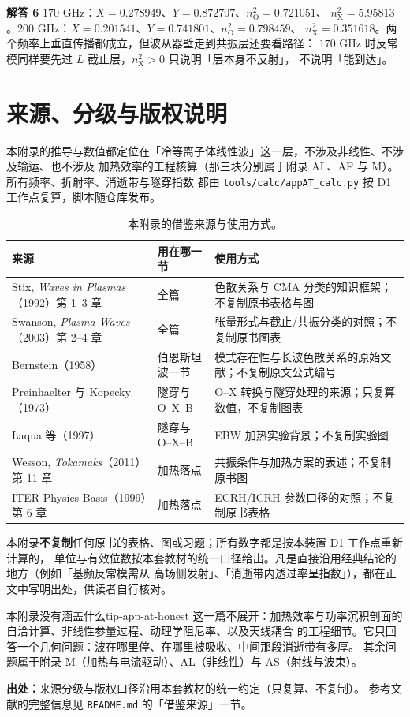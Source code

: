 \textbf{解答 6} $170$ GHz：$X=0.278949$、$Y=0.872707$、$n_\mathrm{O}^2=0.721051$、
$n_\mathrm{X}^2=5.95813$。$200$ GHz：$X=0.201541$、$Y=0.741801$、$n_\mathrm{O}^2=0.798459$、
$n_\mathrm{X}^2=0.351618$。两个频率上垂直传播都成立，但波从器壁走到共振层还要看路径：
$170$ GHz 时反常模同样要先过 $L$ 截止层，$n_\mathrm{X}^2>0$ 只说明「层本身不反射」，
不说明「能到达」。

\section{来源、分级与版权说明}
\label{sec:app-at-source}

\begingroup\small
本附录的推导与数值都定位在「冷等离子体线性波」这一层，不涉及非线性、不涉及输运、也不涉及
加热效率的工程核算（那三块分别属于附录 AL、AF 与 M）。所有频率、折射率、消逝带与隧穿指数
都由 \texttt{tools/\allowbreak{}calc/\allowbreak{}appAT\_calc.py} 按 D1 工作点复算，脚本随仓库发布。

\begin{table}[htbp]
\centering
\small
\caption{本附录的借鉴来源与使用方式。}
\label{tab:app-at-source}
\begin{tabular}{p{4.6cm}p{3.6cm}p{7.6cm}}
\hline
来源 & 用在哪一节 & 使用方式 \\
\hline
Stix, \emph{Waves in Plasmas}（1992）第 1--3 章 & 全篇 & 色散关系与 CMA 分类的知识框架；不复制原书表格与图 \\
Swanson, \emph{Plasma Waves}（2003）第 2--4 章 & 全篇 & 张量形式与截止/共振分类的对照；不复制原书图表 \\
Bernstein（1958）& 伯恩斯坦波一节 & 模式存在性与长波色散关系的原始文献；不复制原文公式编号 \\
Preinhaelter 与 Kopecky（1973）& 隧穿与 O--X--B & O--X 转换与隧穿处理的来源；只复算数值，不复制图表 \\
Laqua 等（1997）& 隧穿与 O--X--B & EBW 加热实验背景；不复制实验图 \\
Wesson, \emph{Tokamaks}（2011）第 11 章 & 加热落点 & 共振条件与加热方案的表述；不复制原书图 \\
ITER Physics Basis（1999）第 6 章 & 加热落点 & ECRH/ICRH 参数口径的对照；不复制原书表格 \\
\hline
\end{tabular}
\end{table}

本附录\textbf{不复制}任何原书的表格、图或习题；所有数字都是按本装置 D1 工作点重新计算的，
单位与有效位数按本套教材的统一口径给出。凡是直接沿用经典结论的地方（例如「基频反常模需从
高场侧发射」、「消逝带内透过率呈指数」），都在正文中写明出处，供读者自行核对。

\begin{tip}{本附录没有涵盖什么}{tip-app-at-honest}
这一篇不展开：加热效率与功率沉积剖面的自洽计算、非线性参量过程、动理学阻尼率、以及天线耦合
的工程细节。它只回答一个几何问题：波在哪里停、在哪里被吸收、中间那段消逝带有多厚。
其余问题属于附录 M（加热与电流驱动）、AL（非线性）与 AS（射线与波束）。
\end{tip}

\textbf{出处：}来源分级与版权口径沿用本套教材的统一约定（只复算、不复制）。
参考文献的完整信息见 \texttt{README.md} 的「借鉴来源」一节。
\endgroup